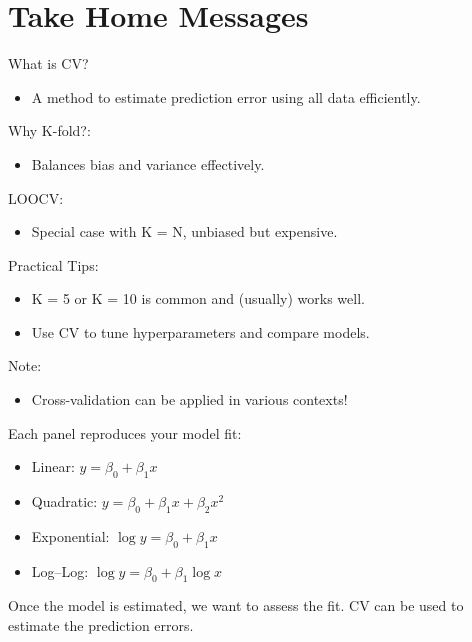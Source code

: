\documentclass[
  letterpaper,
  DIV=11,
  numbers=noendperiod]{scrreprt}
\providecommand{\tightlist}{%
  \setlength{\itemsep}{0pt}\setlength{\parskip}{0pt}}
\begin{document}
\section{Take Home Messages}\label{take-home-messages}

What is CV?

\begin{itemize}
\tightlist
\item
  A method to estimate prediction error using all data efficiently.
\end{itemize}

Why K-fold?:

\begin{itemize}
\tightlist
\item
  Balances bias and variance effectively.
\end{itemize}

LOOCV:

\begin{itemize}
\tightlist
\item
  Special case with K = N, unbiased but expensive.
\end{itemize}

Practical Tips:

\begin{itemize}
\item
  K = 5 or K = 10 is common and (usually) works well.
\item
  Use CV to tune hyperparameters and compare models.
\end{itemize}

Note:

\begin{itemize}
\tightlist
\item
  Cross-validation can be applied in various contexts!
\end{itemize}

Each panel reproduces your model fit:

\begin{itemize}
\tightlist
\item
  Linear: \(y = \beta_0 + \beta_1 x\)
\item
  Quadratic: \(y = \beta_0 + \beta_1 x + \beta_2 x^2\)
\item
  Exponential: \(\log y = \beta_0 + \beta_1 x\)
\item
  Log--Log: \(\log y = \beta_0 + \beta_1 \log x\)
\end{itemize}

Once the model is estimated, we want to assess the fit. CV can be used
to estimate the prediction errors.
\end{document}
